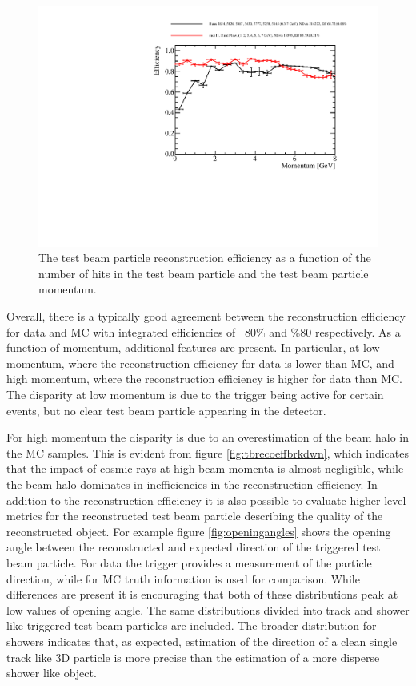 \begin{figure}
\includegraphics[width=1.0\textwidth]{Figures/Metrics/Data/Beam/BeamParticleEfficiencyVsMomentum.pdf}
\caption{The test beam particle reconstruction efficiency as a function of the number of hits in the test beam particle and the test beam particle momentum.}
\label{fig:datamcrecoeff}
\end{figure}

Overall, there is a typically good agreement between the reconstruction efficiency for data and MC with integrated efficiencies of ~80\% and \%80 respectively.  As a function of momentum, additional features are present.  In particular, at low momentum, where the reconstruction efficiency for data is lower than MC, and high momentum, where the reconstruction efficiency is higher for data than MC.  The disparity at low momentum is due to the trigger being active for certain events, but no clear test beam particle appearing in the detector.  %

For high momentum the disparity is due to an overestimation of the beam halo in the MC samples.  This is evident from figure \ref{fig:tbrecoeffbrkdwn}, which indicates that the impact of cosmic rays at high beam momenta is almost negligible, while the beam halo dominates in inefficiencies in the reconstruction efficiency.  
In addition to the reconstruction efficiency it is also possible to evaluate higher level metrics for the reconstructed test beam particle describing the quality of the reconstructed object.  For example figure \ref{fig:openingangles} shows the opening angle between the reconstructed and expected direction of the triggered test beam particle.  For data the trigger provides a measurement of the particle direction, while for MC truth information is used for comparison.  While differences are present it is encouraging that both of these distributions peak at low values of opening angle.  The same distributions divided into track and shower like triggered test beam particles are included.  The broader distribution for showers indicates that, as expected, estimation of the direction of a clean single track like 3D particle is more precise than the estimation of a more disperse shower like object.   

